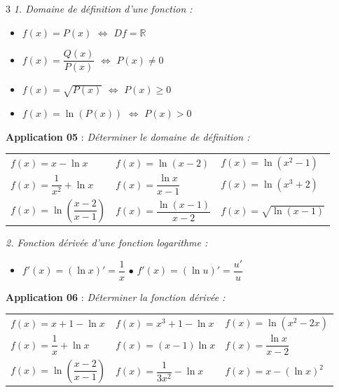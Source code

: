 \documentclass[a4paper,landscape]{article}
\renewcommand{\small}{\fontsize{6}{7}\selectfont}
\begin{document}
\begin{multicols}{3}
\noindent\textit{1. Domaine de définition d'une fonction :}
\vspace{2mm}
\begin{itemize}
\item $f(x) = P(x)$ $\Leftrightarrow$ $Df = \mathbb{R}$
\item $f(x) = \dfrac{Q(x)}{P(x)}$ $\Leftrightarrow$ $P(x) \neq 0$
\item $f(x) = \sqrt{P(x)}$ $\Leftrightarrow$ $P(x) \geq 0$
\item $f(x) = \ln(P(x))$ $\Leftrightarrow$ $P(x) > 0$
\end{itemize}
\vspace{3mm}

\noindent\colorbox{jaune}{\textbf{Application 05}} : \textit{Déterminer le domaine de définition :}
\vspace{2mm}

\begin{minipage}{\columnwidth}
\centering
\small
\begin{tabular}{@{}p{}p{}p{}@{}}
$f(x) = x - \ln x$ &
$f(x) = \ln(x-2)$ &
$f(x) = \ln(x^2-1)$ \\[8pt]
$f(x) = \dfrac{1}{x^2} + \ln x$ &
$f(x) = \dfrac{\ln x}{x-1}$ &
$f(x) = \ln(x^3+2)$ \\[8pt]
$f(x) = \ln\left(\dfrac{x-2}{x-1}\right)$ &
$f(x) = \dfrac{\ln(x-1)}{x-2}$ &
$f(x) = \sqrt{\ln(x-1)}$
\end{tabular}
\end{minipage}
\vspace{5mm}

\noindent\textit{2. Fonction dérivée d'une fonction logarithme :}
\vspace{2mm}
\begin{itemize}
\item $f'(x) = (\ln x)' = \dfrac{1}{x}$ \hspace{15mm} $\bullet$ $f'(x) = (\ln u)' = \dfrac{u'}{u}$
\end{itemize}
\vspace{3mm}

\noindent\colorbox{jaune}{\textbf{Application 06}} : \textit{Déterminer la fonction dérivée :}
\vspace{2mm}

\begin{minipage}{\columnwidth}
\centering
\small
\begin{tabular}{@{}p{}p{}p{}@{}}
$f(x) = x + 1 - \ln x$ &
$f(x) = x^3 + 1 - \ln x$ &
$f(x) = \ln(x^2 - 2x)$ \\[8pt]
$f(x) = \dfrac{1}{x} + \ln x$ &
$f(x) = (x-1)\ln x$ &
$f(x) = \dfrac{\ln x}{x-2}$ \\[8pt]
$f(x) = \ln\left(\dfrac{x-2}{x-1}\right)$ &
$f(x) = \dfrac{1}{3x^2} - \ln x$ &
$f(x) = x - (\ln x)^2$
\end{tabular}
\end{minipage}
\vspace{5mm}


\end{multicols}
\end{document}
